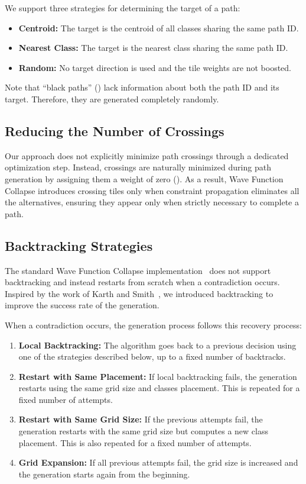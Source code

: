 \documentclass[../../main.tex]{subfiles}
\begin{document}
\noindent We support three strategies for determining the target of a path:

\begin{itemize}
    \item \textbf{\textbf{Centroid}:} The target is the centroid of all classes sharing the same path ID.
    \item \textbf{\textbf{Nearest Class}:} The target is the nearest class sharing the same path ID.
    \item \textbf{\textbf{Random}:} No target direction is used and the tile weights are not boosted.
\end{itemize}

Note that ``black paths'' () lack information about both the path ID and its target. Therefore, they are generated completely randomly.

\subsection{Reducing the Number of Crossings}
Our approach does not explicitly minimize path crossings through a dedicated optimization step. Instead, crossings are naturally minimized during path generation by assigning them a weight of zero (). As a result, Wave Function Collapse introduces crossing tiles only when constraint propagation eliminates all the alternatives, ensuring they appear only when strictly necessary to complete a path.

\subsection{Backtracking Strategies}
\label{subsec:backtracking_strategies}

The standard Wave Function Collapse implementation~ does not support backtracking and instead restarts from scratch when a contradiction occurs. Inspired by the work of Karth and Smith~, we introduced backtracking to improve the success rate of the generation.

When a contradiction occurs, the generation process follows this recovery process:

\begin{enumerate}
    \item \textbf{Local Backtracking:} The algorithm goes back to a previous decision using one of the strategies described below, up to a fixed number of backtracks.
    \item \textbf{Restart with Same Placement:} If local backtracking fails, the generation restarts using the same grid size and classes placement. This is repeated for a fixed number of attempts.
    \item \textbf{Restart with Same Grid Size:} If the previous attempts fail, the generation restarts with the same grid size but computes a new class placement. This is also repeated for a fixed number of attempts.
    \item \textbf{Grid Expansion:} If all previous attempts fail, the grid size is increased and the generation starts again from the beginning.
\end{enumerate}
\end{document}
